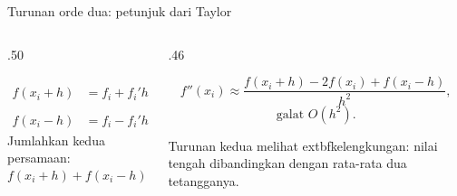 \documentclass[aspectratio=169,10pt]{beamer}
\begin{document}
\begin{frame}{Turunan orde dua: petunjuk dari Taylor}
\scriptsize
\begin{columns}[T,totalwidth=\textwidth]
\begin{column}{.50\textwidth}
\begin{bluebox}[Pusatkan di $x_i$]
\[
\begin{aligned}
f(x_i+h)&=f_i+f_i'h+\frac{f_i''}{2}h^2+\frac{f_i^{(3)}}{6}h^3+\cdots,\\
f(x_i-h)&=f_i-f_i'h+\frac{f_i''}{2}h^2-\frac{f_i^{(3)}}{6}h^3+\cdots.
\end{aligned}
\]
Jumlahkan kedua persamaan:
\[
f(x_i+h)+f(x_i-h)=2f_i+f_i''h^2+O(h^4).
\]
\end{bluebox}
\end{column}
\begin{column}{.46\textwidth}
\begin{orangebox}
\[
f''(x_i)\approx
\frac{f(x_i+h)-2f(x_i)+f(x_i-h)}{h^2},
\]
\[
\text{galat }O(h^2).
\]
\end{orangebox}
\begin{greenbox}[Makna]
Turunan kedua melihat 	extbf{kelengkungan}: nilai tengah dibandingkan dengan rata-rata dua tetangganya.
\end{greenbox}
\end{column}
\end{columns}
\end{frame}
\end{document}
